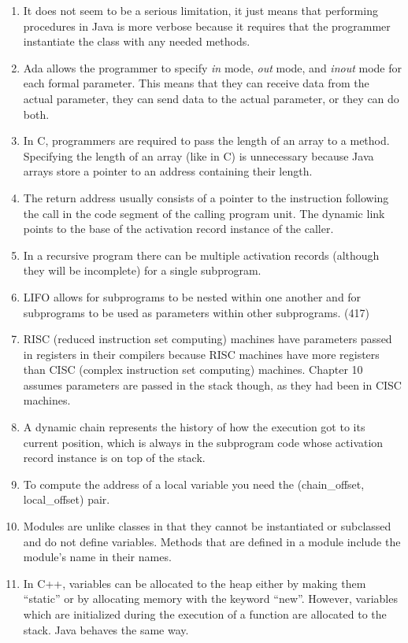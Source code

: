 \documentclass{article}
\begin{document}
\begin{enumerate}
\item It does not seem to be a serious limitation, it just means that performing procedures in Java is more verbose because it requires that the programmer instantiate the class with any needed methods.
\item Ada allows the programmer to specify \textit{in} mode, \textit{out} mode, and \textit{inout} mode for each formal parameter.  This means that they can receive data from the actual parameter, they can send data to the actual parameter, or they can do both.
\item In C, programmers are required to pass the length of an array to a method. Specifying the length of an array (like in C) is unnecessary because Java arrays store a pointer to an address containing their length.
\item The return address usually consists of a pointer to the instruction following the call in the code segment of the calling program unit.  The dynamic link points to the base of the activation record instance of the caller.
\item In a recursive program there can be multiple activation records (although they will be incomplete) for a single subprogram.
\item LIFO allows for subprograms to be nested within one another and for subprograms to be used as parameters within other subprograms. (417)
\item RISC (reduced instruction set computing) machines have parameters passed in registers in their compilers because RISC machines have more registers than CISC (complex instruction set computing) machines. Chapter 10 assumes parameters are passed in the stack though, as they had been in CISC machines.
\item A dynamic chain represents the history of how the execution got to its current position, which is always in the subprogram code whose activation record instance is on top of the stack.
\item To compute the address of a local variable you need the (chain_offset, local_offset) pair.
\item Modules are unlike classes in that they cannot be instantiated or subclassed and do not define variables. Methods that are defined in a module include the module’s name in their names.
\item In C++, variables can be allocated to the heap either by making them “static” or by allocating memory with the keyword “new”. However, variables which are initialized during the execution of a function are allocated to the stack. Java behaves the same way.

\end{enumerate}
\end{document}
